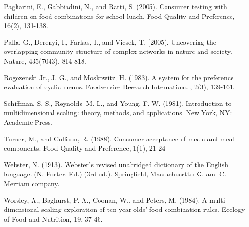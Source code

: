 \noindent
Pagliarini, E., Gabbiadini, N., and Ratti, S. (2005). Consumer testing with children on food combinations for school lunch. Food Quality and Preference, 16(2), 131-138.

\noindent
Palla, G., Derenyi, I., Farkas, I., and Vicsek, T. (2005). Uncovering the overlapping community structure of complex networks in nature and society. Nature, 435(7043), 814-818.

\noindent
Rogozenski Jr., J. G., and Moskowitz, H. (1983). A system for the preference evaluation of cyclic menus. Foodservice Research International, 2(3), 139-161.

\noindent
Schiffman, S. S., Reynolds, M. L., and Young, F. W. (1981). Introduction to multidimensional scaling: theory, methods, and applications. New York, NY: Academic Press.

\noindent
Turner, M., and Collison, R. (1988). Consumer acceptance of meals and meal components. Food Quality and Preference, 1(1), 21-24.

\noindent
Webster, N. (1913). Websterʼs revised unabridged dictionary of the English language. (N. Porter, Ed.) (3rd ed.). Springfield, Massachusetts: G. and C. Merriam company.

\noindent
Worsley, A., Baghurst, P. A., Coonan, W., and Peters, M. (1984). A multi-dimensional scaling exploration of ten year olds' food combination rules. Ecology of Food and Nutrition, 19, 37-46.

\pagebreak
\renewcommand\bibname{{REFERENCES}} %

